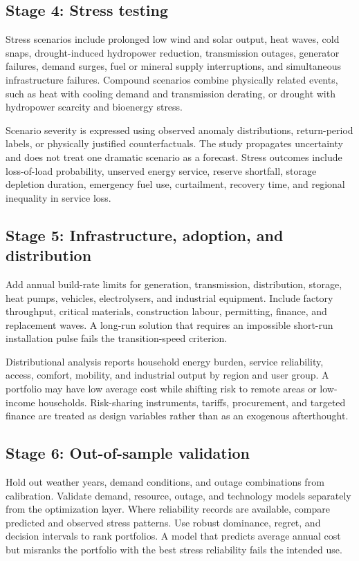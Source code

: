 \documentclass[conference]{IEEEtran}
\begin{document}
\subsection{Stage 4: Stress testing}
Stress scenarios include prolonged low wind and solar output, heat waves, cold snaps, drought-induced hydropower reduction, transmission outages, generator failures, demand surges, fuel or mineral supply interruptions, and simultaneous infrastructure failures. Compound scenarios combine physically related events, such as heat with cooling demand and transmission derating, or drought with hydropower scarcity and bioenergy stress.

Scenario severity is expressed using observed anomaly distributions, return-period labels, or physically justified counterfactuals. The study propagates uncertainty and does not treat one dramatic scenario as a forecast. Stress outcomes include loss-of-load probability, unserved energy service, reserve shortfall, storage depletion duration, emergency fuel use, curtailment, recovery time, and regional inequality in service loss.

\subsection{Stage 5: Infrastructure, adoption, and distribution}
Add annual build-rate limits for generation, transmission, distribution, storage, heat pumps, vehicles, electrolysers, and industrial equipment. Include factory throughput, critical materials, construction labour, permitting, finance, and replacement waves. A long-run solution that requires an impossible short-run installation pulse fails the transition-speed criterion.

Distributional analysis reports household energy burden, service reliability, access, comfort, mobility, and industrial output by region and user group. A portfolio may have low average cost while shifting risk to remote areas or low-income households. Risk-sharing instruments, tariffs, procurement, and targeted finance are treated as design variables rather than as an exogenous afterthought.

\subsection{Stage 6: Out-of-sample validation}
Hold out weather years, demand conditions, and outage combinations from calibration. Validate demand, resource, outage, and technology models separately from the optimization layer. Where reliability records are available, compare predicted and observed stress patterns. Use robust dominance, regret, and decision intervals to rank portfolios. A model that predicts average annual cost but misranks the portfolio with the best stress reliability fails the intended use.
\end{document}
